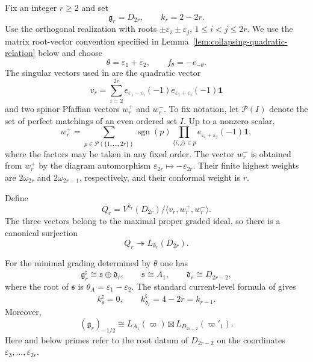 \documentclass[11pt,reqno]{amsart}
\theoremstyle{definition}
\theoremstyle{remark}
\providecommand{\Vac}{\mathbf{1}}
\begin{document}
Fix an integer $r\ge2$ and set
\begin{equation*}
  \mathfrak g_r=D_{2r},
  \qquad
  k_r=2-2r.
\end{equation*}
Use the orthogonal realization with roots
$\pm\varepsilon_i\pm\varepsilon_j$,
$1\le i<j\le2r$.  We use the matrix root-vector convention specified in
Lemma~\ref{lem:collapsing-quadratic-relation} below and choose
\begin{equation*}
  \theta=\varepsilon_1+\varepsilon_2,
  \qquad
  f_\theta=-e_{-\theta}.
\end{equation*}
The singular vectors used in
\cite{AdamovicKacMosenederFrajriaPapiPerse2020} are the quadratic vector
\begin{equation}
  v_r=
  \sum_{i=2}^{2r}
  e_{\varepsilon_1-\varepsilon_i}(-1)
  e_{\varepsilon_1+\varepsilon_i}(-1)\Vac
  \label{eq:collapsing-vr}
\end{equation}
and two spinor Pfaffian vectors $w_r^+$ and $w_r^-$.  To fix notation, let
$\mathcal P(I)$ denote the set of perfect matchings of an even ordered set
$I$.  Up to a nonzero scalar,
\begin{equation*}
  w_r^+
  =
  \sum_{p\in\mathcal P(\{1,\ldots,2r\})}
  \operatorname{sgn}(p)
  \prod_{\{i,j\}\in p}
  e_{\varepsilon_i+\varepsilon_j}(-1)\Vac,
\end{equation*}
where the factors may be taken in any fixed order.  The vector $w_r^-$ is
obtained from $w_r^+$ by the diagram automorphism
$\varepsilon_{2r}\mapsto-\varepsilon_{2r}$.  Their finite highest weights
are $2\omega_{2r}$ and $2\omega_{2r-1}$, respectively, and their conformal
weight is $r$.

Define
\begin{equation}
  Q_r
  =
  V^{k_r}(D_{2r})
  \big/
  \langle v_r,w_r^+,w_r^-\rangle.
  \label{eq:collapsing-Qr}
\end{equation}
The three vectors belong to the maximal proper graded ideal, so there is a
canonical surjection
\begin{equation*}
  Q_r\twoheadrightarrow L_{k_r}(D_{2r}).
\end{equation*}

For the minimal grading determined by $\theta$ one has
\begin{equation*}
  \mathfrak g_r^\natural
  \cong
  \mathfrak s\oplus\mathfrak d_r,
  \qquad
  \mathfrak s\cong A_1,
  \qquad
  \mathfrak d_r\cong D_{2r-2},
\end{equation*}
where the root of $\mathfrak s$ is
$\theta_A=\varepsilon_1-\varepsilon_2$.  The standard current-level formula of
\cite{AdamovicKacMosenederFrajriaPapiPerse2018} gives
\begin{equation}
  k^\natural_{\mathfrak s}=0,
  \qquad
  k^\natural_{\mathfrak d_r}=4-2r=k_{r-1}.
  \label{eq:collapsing-current-levels}
\end{equation}
Moreover,
\begin{equation}
  (\mathfrak g_r)_{-1/2}
  \cong
  L_{A_1}(\varpi)\boxtimes
  L_{D_{2r-2}}(\varpi'_1).
  \label{eq:collapsing-half-module}
\end{equation}
Here and below primes refer to the root datum of $D_{2r-2}$ on the
coordinates $\varepsilon_3,\ldots,\varepsilon_{2r}$.
\end{document}
